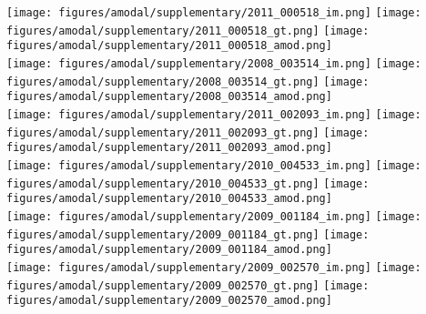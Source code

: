 \begin{figure*}
\centering\texttt{[image: figures/amodal/supplementary/2011\_000518\_im.png]}
\texttt{[image: figures/amodal/supplementary/2011\_000518\_gt.png]}
\texttt{[image: figures/amodal/supplementary/2011\_000518\_amod.png]} \\ 
\texttt{[image: figures/amodal/supplementary/2008\_003514\_im.png]}
\texttt{[image: figures/amodal/supplementary/2008\_003514\_gt.png]}
\texttt{[image: figures/amodal/supplementary/2008\_003514\_amod.png]} \\ 
\texttt{[image: figures/amodal/supplementary/2011\_002093\_im.png]}
\texttt{[image: figures/amodal/supplementary/2011\_002093\_gt.png]}
\texttt{[image: figures/amodal/supplementary/2011\_002093\_amod.png]} \\ 
\texttt{[image: figures/amodal/supplementary/2010\_004533\_im.png]}
\texttt{[image: figures/amodal/supplementary/2010\_004533\_gt.png]}
\texttt{[image: figures/amodal/supplementary/2010\_004533\_amod.png]} \\ 
\texttt{[image: figures/amodal/supplementary/2009\_001184\_im.png]}
\texttt{[image: figures/amodal/supplementary/2009\_001184\_gt.png]}
\texttt{[image: figures/amodal/supplementary/2009\_001184\_amod.png]} \\ 
\texttt{[image: figures/amodal/supplementary/2009\_002570\_im.png]}
\texttt{[image: figures/amodal/supplementary/2009\_002570\_gt.png]}
\texttt{[image: figures/amodal/supplementary/2009\_002570\_amod.png]} \\ 
\end{figure*}
